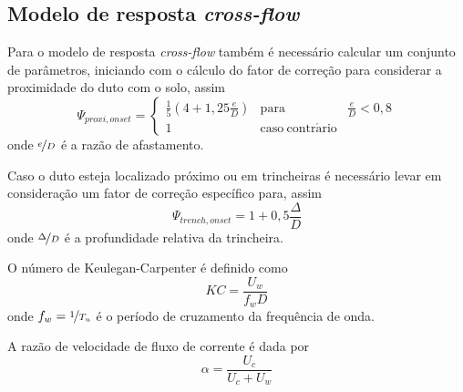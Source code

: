 \subsection{Modelo de resposta \textit{cross-flow}}

Para o modelo de resposta \textit{cross-flow} também  é necessário calcular um conjunto de parâmetros, iniciando com o cálculo do fator de correção para considerar a proximidade do duto com o solo, assim
\begin{equation}
\label{eq:jdsn-Psi}
\Psi_{\mathit{proxi}, \mathit{onset}} = 
\left\{
\begin{matrix} 
\frac{1}{5}\left(4 + 1,25\frac{e}{D} \right) & \mathrm{para} & \frac{e}{D} < {0,8}  \\ 
1                                            & \mathrm{caso~contr\acute{a}rio} 
\end{matrix}
\right.
\end{equation}
onde $\nicefrac{e}{D}$ é a razão de afastamento.

Caso o duto esteja localizado próximo ou em trincheiras é necessário levar em consideração um fator de correção específico para, assim
\begin{equation}
\label{eq:jdsn-Psitren}
\Psi_{\mathit{trench}, \mathit{onset}} = 1 + 0,5\frac{\Delta}{D}
\end{equation}
onde $\nicefrac{\Delta}{D}$ é a profundidade relativa da trincheira.

O número de Keulegan-Carpenter é definido como
\begin{equation}
\label{eq:jdsn-KC}
\mathit{KC} = \frac{U_w}{f_w D}
\end{equation}
onde $f_w = \nicefrac{1}{T_u}$ é o período de cruzamento da frequência de onda.

A razão de velocidade de fluxo de corrente é dada por
\begin{equation}
\label{eq:jdsn-alfa}
\alpha = \frac{U_c}{U_c + U_w}
\end{equation}

